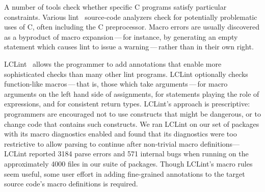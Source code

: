 \documentclass[10pt]{article}
\begin{document}

A number of tools check whether specific C programs satisfy particular
constraints.  Various lint~\cite{Johnson77} source-code analyzers check
for potentially problematic uses of C, often including the C preprocessor.
Macro errors are usually discovered as a byproduct of macro
expansion\,---\,for instance, by generating an empty statement which causes
lint to issue a warning\,---\,rather than in their own right.

LCLint~\cite{Evans-fse94,Evans:LCLint} allows the programmer to add
annotations that enable more sophisticated checks than many other lint
programs.  LCLint optionally checks function-like macros\,---\,that is,
those which take arguments\,---\,for macro arguments on the left hand
side of assignments, for statements playing the role of expressions, and
for consistent return types.  LCLint's approach is prescriptive:
programmers are encouraged not to use constructs that might be
dangerous, or to change code that contains such constructs.  We ran
LCLint on our set of packages with its macro diagnostics enabled and
found that its diagnostics were too restrictive to allow parsing to
continue after non-trivial macro definitions---LCLint reported 3184
parse errors and 571 internal bugs when running on the approximately
4000 files in our suite of packages.  Though LCLint's macro rules seem
useful, some user effort in adding fine-grained annotations to the
target source code's macro definitions is required.

\end{document}
